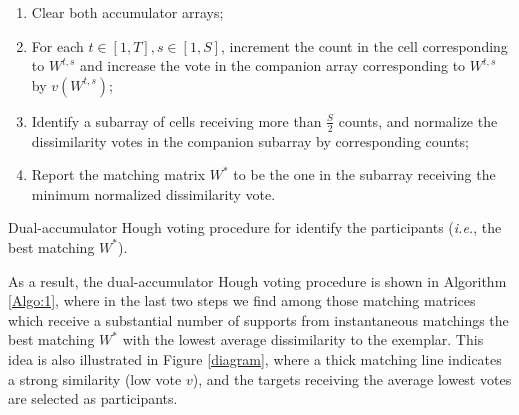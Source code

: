 \begin{algorithm}
\footnotesize{
\begin{enumerate}
\item Clear both accumulator arrays;
\item For each $t\in[1,T], s\in[1,S]$, increment the count in the cell corresponding to $W^{t,s}$ and increase the vote in the companion array corresponding to $W^{t,s}$ by $v(W^{t,s})$;
\item Identify a subarray of cells receiving more than $\frac{S}{2}$ counts, and normalize the dissimilarity votes in the companion subarray by corresponding counts;
\item Report the matching matrix $W^{*}$ to be the one in the subarray receiving the minimum normalized dissimilarity vote.
\end{enumerate}
}
\caption{\small Dual-accumulator Hough voting procedure for identify the participants (\textit{i.e.}, the best matching $W^{*}$).}
\label{Algo:1}
\end{algorithm}

 As a result, the dual-accumulator Hough voting procedure is shown in Algorithm \ref{Algo:1}, where in the last two steps we find among those matching matrices which receive a substantial number of supports from instantaneous matchings the best matching $W^{*}$ with the lowest average dissimilarity to the exemplar. This idea is also illustrated in Figure \ref{diagram}, where a thick matching line indicates a strong similarity (low vote $v$), and the targets receiving the average lowest votes are selected as participants.


